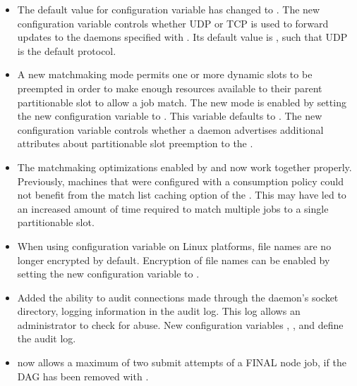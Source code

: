 \begin{itemize}
\item The default value for configuration variable
 has changed to .
The new configuration variable 
controls whether UDP or TCP is used to forward updates to the
 daemons specified with .
Its default value is , 
such that UDP is the default protocol.

\item A new matchmaking mode permits one or more dynamic slots to
be preempted in order to make enough resources available to their parent
partitionable slot to allow a job match.
The new mode is enabled by setting the new 
configuration variable  to .
This variable defaults to .
The new configuration variable 
controls whether a  daemon advertises additional attributes
about partitionable slot preemption to the .

\item The matchmaking optimizations enabled by 
and  now work together properly.
Previously, machines that were configured with a consumption policy
could not benefit from the match list caching option of the
.
This may have led to an increased amount of time required to match
multiple jobs to a single partitionable slot.

\item When using configuration variable 
on Linux platforms, 
file names are no longer encrypted by default.  
Encryption of file names can be enabled by setting 
the new configuration variable  
to .

\item Added the ability to audit connections made through the
 daemon's socket directory, 
logging information in the  audit log.
This log allows an administrator to check for abuse.
New configuration variables ,
,
and  define the
 audit log.

\item {} now allows a maximum of two submit attempts of a FINAL
node job, if the DAG has been removed with .


\end{itemize}
